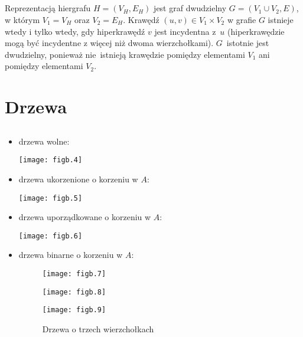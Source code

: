 \subsection{} %
Reprezentacją hiergrafu $H=(V_H,E_H)$ jest graf dwudzielny $G=(V_1\cup V_2,E)$, w którym $V_1=V_H$ oraz $V_2=E_H$. Krawędź $(u,v)\in V_1\times V_2$ w grafie $G$ istnieje wtedy i tylko wtedy, gdy hiperkrawędź $v$ jest incydentna z~$u$ (hiperkrawędzie mogą być incydentne z więcej niż dwoma wierzchołkami). $G$~istotnie jest dwudzielny, ponieważ nie~istnieją krawędzie pomiędzy elementami $V_1$ ani pomiędzy elementami $V_2$.

\section{Drzewa}

\subsection{} %
\begin{itemize}
	\item drzewa wolne:
	\begin{center}
		\texttt{[image: figb.4]}
	\end{center}
	\item drzewa ukorzenione o korzeniu w $A$:
	\begin{center}
		\texttt{[image: figb.5]}
	\end{center}
	\item drzewa uporządkowane o korzeniu w $A$:
	\begin{center}
		\texttt{[image: figb.6]}
	\end{center}
	\item drzewa binarne o korzeniu w $A$:
	\begin{figure}[!h]
		\begin{center}
			\texttt{[image: figb.7]} \\
		\end{center}
		\begin{center}
			\texttt{[image: figb.8]} \\
		\end{center}
		\begin{center}
			\texttt{[image: figb.9]}
		\end{center}
		\caption{Drzewa o trzech wierzchołkach}
	\end{figure}
\end{itemize}

